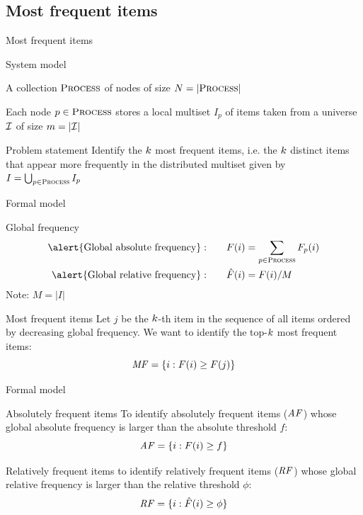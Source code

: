 \subsection{Most frequent items}

\begin{frame}{Most frequent items}

\begin{block}{System model}

\BI
\item A collection $\textsc{Process}$ of nodes of size $N=|\textsc{Process}|$
\item Each node $p \in \textsc{Process}$ stores a local multiset $I_p$ of items taken
from a universe $\cal I$ of size $m=|\cal I|$
\EI
\end{block}

\begin{block}{Problem statement}
Identify the $k$ \alert{most frequent items}, i.e. the $k$ distinct items
that appear more frequently in the distributed multiset given by 
$I = \bigcup_{p \in \textsc{Process}} I_p$
\end{block}

\begin{Bib}
\end{Bib}

\end{frame}


\begin{frame}{Formal model}

\begin{block}{Global frequency}
\begin{align*}
\textrm{\alert{Global absolute frequency}}: \qquad& \F(i) = \sum_{p \in \Process} \F_p(i) \\
\textrm{\alert{Global relative frequency}}: \qquad& \FR(i) = \F(i)/\M
\end{align*}
Note: $M = |I|$
\end{block}

\begin{block}{Most frequent items}
Let $j$ be the $k$-th item in the sequence of all items ordered by decreasing
global frequency. We want to identify the top-$k$ most frequent items:
\[
  \mathit{MF} = \{ i : F(i) \geq F(j) \}
\]
\end{block}


\end{frame}

\begin{frame}{Formal model}

\begin{block}{Absolutely frequent items}
To identify \alert{absolutely frequent} items ($\mathit{AF}$) whose
global absolute frequency is larger than the absolute threshold $f$:
\[
  \mathit{AF} = \{ i : F(i) \geq f \}
\]
\end{block}

\medskip
\begin{block}{Relatively frequent items}
to identify \alert{relatively frequent} items ($\mathit{RF}$) whose
global relative frequency is larger than the relative threshold $\phi$:
\[
  \mathit{RF} = \{ i : \hat{F}(i) \geq \phi \}
\]
\end{block}

\end{frame}

